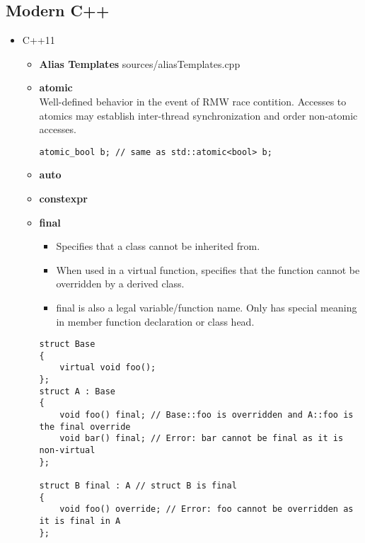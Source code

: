 \documentclass{article}
\begin{document}
    \subsection{Modern C++}
      \begin{itemize}
        \item C++11
          \begin{itemize}
            \item \textbf{Alias Templates}
               {sources/aliasTemplates.cpp}
            \item \textbf{atomic} \\
              Well-defined behavior in the event of RMW race contition. Accesses to atomics may establish inter-thread synchronization and order non-atomic accesses.
              \begin{lstlisting}[style=cpp]
atomic_bool b; // same as std::atomic<bool> b;
         \end{lstlisting}
            \item \textbf{auto}
            \item \textbf{constexpr}
            \item \textbf{final} \\
              \begin{itemize}
                \item Specifies that a class cannot be inherited from.
                \item When used in a virtual function, specifies that the function cannot be overridden by a derived class.
                \item final is also a legal variable/function name. Only has special meaning in member function declaration or class head.
              \end{itemize}
              \begin{lstlisting}[style=cpp]
struct Base
{
    virtual void foo();
};
struct A : Base
{
    void foo() final; // Base::foo is overridden and A::foo is the final override
    void bar() final; // Error: bar cannot be final as it is non-virtual
};
 
struct B final : A // struct B is final
{
    void foo() override; // Error: foo cannot be overridden as it is final in A
};
 

\end{lstlisting}
\end{itemize}
\end{itemize}
\end{document}
